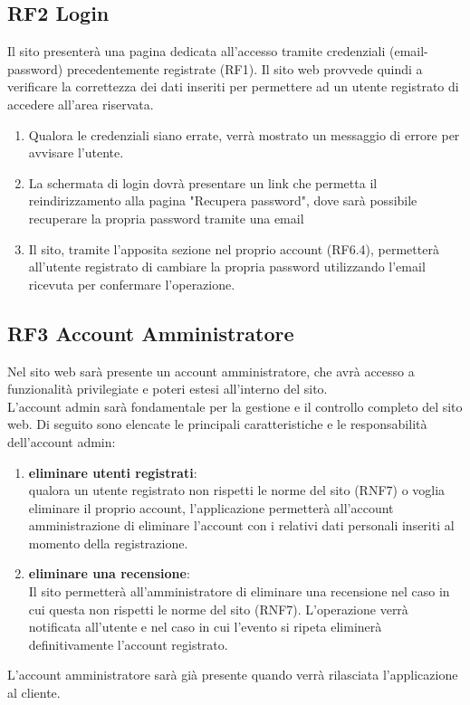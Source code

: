 \documentclass[a4paper,12pt]{article}
\begin{document}
\subsection*{RF2 Login}
 Il sito presenterà una pagina dedicata all’accesso tramite credenziali (email-password) precedentemente registrate (RF1).
 Il sito web provvede quindi a verificare la correttezza dei dati inseriti per permettere ad un utente registrato di accedere all'area riservata.
 \begin{enumerate} [leftmargin=40pt]
    \item Qualora le credenziali siano errate, verrà mostrato un messaggio di errore per avvisare l'utente.
    \item La schermata di login dovrà presentare un link che permetta il reindirizzamento alla pagina "Recupera password", dove sarà possibile recuperare la propria password tramite una email
    \item Il sito, tramite l’apposita sezione nel proprio account (RF6.4), permetterà all’utente registrato di cambiare la propria password utilizzando l’email ricevuta per confermare l'operazione.
\end{enumerate}


\subsection*{RF3 Account Amministratore}
Nel sito web sarà presente un account amministratore, che avrà accesso a funzionalità privilegiate e poteri estesi all'interno del sito.\\
L'account admin sarà fondamentale per la gestione e il controllo completo del sito web. Di seguito sono elencate le principali caratteristiche e le responsabilità dell'account admin:
 \begin{enumerate} [leftmargin=40pt]
     \item \textbf{eliminare utenti registrati}:\\ qualora un utente registrato non rispetti le norme del sito (RNF7) o voglia eliminare il proprio account, l'applicazione permetterà all'account amministrazione di eliminare l'account con i relativi dati personali inseriti al momento della registrazione.
     \item \textbf{eliminare una recensione}:\\ Il sito permetterà all'amministratore di eliminare una recensione nel caso in cui questa non rispetti le norme del sito (RNF7). L'operazione verrà notificata all'utente e nel caso in cui l'evento si ripeta eliminerà definitivamente l'account registrato. 
 \end{enumerate}
 L'account amministratore sarà già presente quando verrà rilasciata l'applicazione al cliente. 
\end{document}
